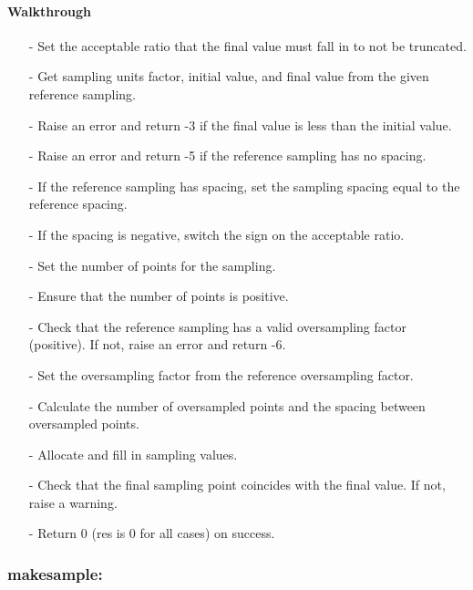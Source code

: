 \documentclass[letterpaper,12pt]{article}
\begin{document}
\paragraph{Walkthrough}
\begin{enumerate}[leftmargin=10pt, noitemsep, parsep=0pt, topsep=0ex]
\item[-] Set the acceptable ratio that the final value must fall in to not be truncated.
\item[-] Get sampling units factor, initial value, and final value from the given reference sampling.
\item[-] Raise an error and return -3 if the final value is less than the initial value.
\item[-] Raise an error and return -5 if the reference sampling has no spacing.
\item[-] If the reference sampling has spacing, set the sampling spacing equal to the reference spacing.
\item[-] If the spacing is negative, switch the sign on the acceptable ratio.
\item[-] Set the number of points for the sampling.
\item[-] Ensure that the number of points is positive.
\item[-] Check that the reference sampling has a valid oversampling factor (positive). If not, raise an error and return -6.
\item[-] Set the oversampling factor from the reference oversampling factor.
\item[-] Calculate the number of oversampled points and the spacing between oversampled points.
\item[-] Allocate and fill in sampling values.
\item[-] Check that the final sampling point coincides with the final value. If not, raise a warning.
\item[-] Return 0 (res is 0 for all cases) on success.
\end{enumerate}

\subsubsection{makesample:}
\end{document}

